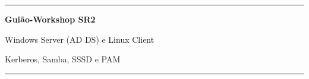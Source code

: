 
\begin{titlepage}
  \centering
  \vspace*{\fill}
  {\color{azul}\rule{\linewidth}{1.2pt}\par}
  \vspace{1.5em}
  {\Huge\bfseries\color{azul} Guião-Workshop SR2\par}
  \vspace{1.2em}
  {\LARGE Windows Server (AD DS) e Linux Client\par}
  \vspace{0.5em}
  {\Large Kerberos, Samba, SSSD e PAM\par}
  \vspace{1.5em}
  {\color{azul}\rule{\linewidth}{1.2pt}\par}
  \vspace*{\fill}
\end{titlepage}

\pagestyle{plain}
\tableofcontents
\clearpage
{}
\pagestyle{fancy}
